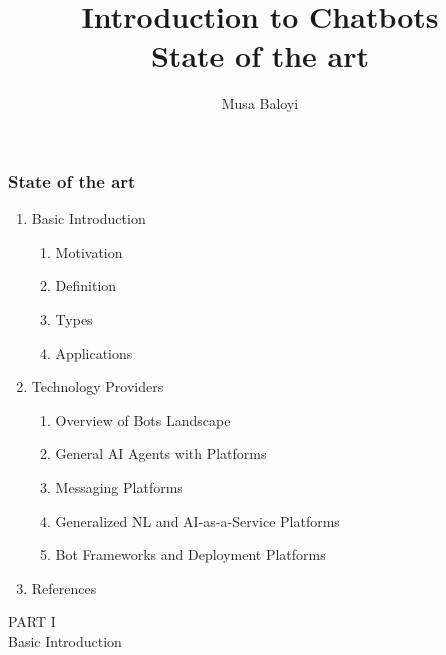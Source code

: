 \documentclass[11pt]{beamer}
\begin{document}
	\author{Musa Baloyi}
	\title{Introduction to Chatbots \\ State of the art} %
	\begin{frame}[plain]
	\maketitle
\end{frame}

\begin{frame}
	\frametitle{State of the art}
	\begin{enumerate}
		\item Basic Introduction
		\begin{enumerate}
			\item Motivation
			\item Definition
			\item Types
			\item Applications
		\end{enumerate}
		\item Technology Providers
		\begin{enumerate}
			\item Overview of Bots Landscape
			\item General AI Agents with Platforms
			\item Messaging Platforms
			\item Generalized NL and AI-as-a-Service Platforms
			\item Bot Frameworks and Deployment Platforms
		\end{enumerate}
		\item References
	\end{enumerate}
\end{frame}


\begin{frame}
\begin{center}
	PART I \\ Basic Introduction 
\end{center}
\end{frame}
\end{document}
